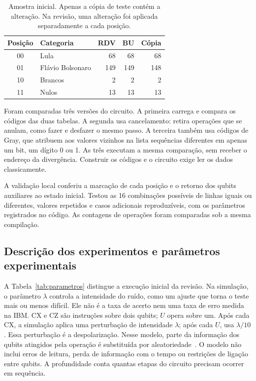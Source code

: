 \documentclass[conference]{IEEEtran}
\begin{document}
\begin{table}[!ht]
\caption{Amostra inicial. Apenas a cópia de teste contém a alteração. Na revisão, uma alteração foi aplicada separadamente a cada posição.}
\label{tab:recorte}
\centering\small
\begin{tabular}{@{}clrrr@{}}
\toprule
Posição & Categoria & RDV & BU & Cópia \\
\midrule
00 & Lula & 68 & 68 & 68 \\
01 & Flávio Bolsonaro & 149 & 149 & 148 \\
10 & Brancos & 2 & 2 & 2 \\
11 & Nulos & 13 & 13 & 13 \\
\bottomrule
\end{tabular}
\end{table}

Foram comparadas três versões do circuito. A primeira carrega e compara os códigos das duas tabelas. A segunda usa cancelamento: retira operações que se anulam, como fazer e desfazer o mesmo passo. A terceira também usa códigos de Gray, que atribuem aos valores vizinhos na lista sequências diferentes em apenas um bit, um dígito 0 ou 1. As três executam a mesma comparação, sem receber o endereço da divergência. Construir os códigos e o circuito exige ler os dados classicamente.

A validação local conferiu a marcação de cada posição e o retorno dos qubits auxiliares ao estado inicial. Testou as 16 combinações possíveis de linhas iguais ou diferentes, valores repetidos e casos adicionais reproduzíveis, com os parâmetros registrados no código. As contagens de operações foram comparadas sob a mesma compilação.

\subsection{Descrição dos experimentos e parâmetros experimentais}
A Tabela~\ref{tab:parametros} distingue a execução inicial da revisão. Na simulação, o parâmetro $\lambda$ controla a intensidade do ruído, como um ajuste que torna o teste mais ou menos difícil. Ele não é a taxa de acerto nem uma taxa de erro medida na IBM. CX e CZ são instruções sobre dois qubits; $U$ opera sobre um. Após cada CX, a simulação aplica uma perturbação de intensidade $\lambda$; após cada $U$, usa $\lambda/10$. Essa perturbação é a despolarização. Nesse modelo, parte da informação dos qubits atingidos pela operação é substituída por aleatoriedade~\cite{qiskitDepolarizing}. O modelo não inclui erros de leitura, perda de informação com o tempo ou restrições de ligação entre qubits. A profundidade conta quantas etapas do circuito precisam ocorrer em sequência.
\end{document}

